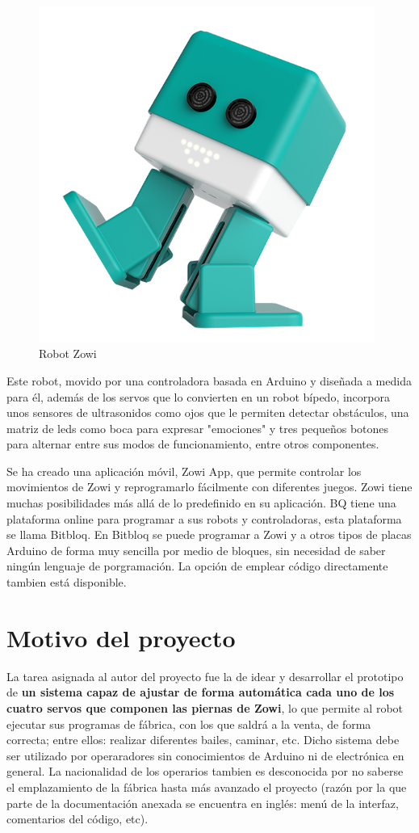 \begin{figure}[h]
\centering
\includegraphics[width=110mm]{Figures/zowi-img.png}
\caption[Robot Zowi]{Robot Zowi}
\label{fig:Zowi-img}
\end{figure}

Este robot, movido por una controladora basada en Arduino y diseñada a medida para él, además de los servos que lo convierten en un robot bípedo, incorpora unos sensores de ultrasonidos como ojos que le permiten detectar obstáculos, una matriz de leds como boca para expresar "emociones" y tres pequeños botones para alternar entre sus modos de funcionamiento, entre otros componentes.

Se ha creado una aplicación móvil, Zowi App, que permite controlar los movimientos de Zowi y reprogramarlo fácilmente con diferentes juegos. Zowi tiene muchas posibilidades más allá de lo predefinido en su aplicación. BQ tiene una plataforma online para programar a sus robots y controladoras, esta plataforma se llama Bitbloq. En Bitbloq se puede programar a Zowi y a otros tipos de placas Arduino de forma muy sencilla por medio de bloques, sin necesidad de saber ningún lenguaje de porgramación. La opción de emplear código directamente tambien está disponible.

\section{Motivo del proyecto}
La tarea asignada al autor del proyecto fue la de idear y desarrollar el prototipo de \textbf{un sistema capaz de ajustar de forma automática cada uno de los cuatro servos que componen las piernas de Zowi}, lo que permite al robot ejecutar sus programas de fábrica, con los que saldrá a la venta, de forma correcta; entre ellos: realizar diferentes bailes, caminar, etc. Dicho sistema debe ser utilizado por operaradores sin conocimientos de Arduino ni de electrónica en general. La nacionalidad de los operarios tambien es desconocida por no saberse el emplazamiento de la fábrica hasta más avanzado el proyecto (razón por la que parte de la documentación anexada se encuentra en inglés: menú de la interfaz, comentarios del código, etc).

